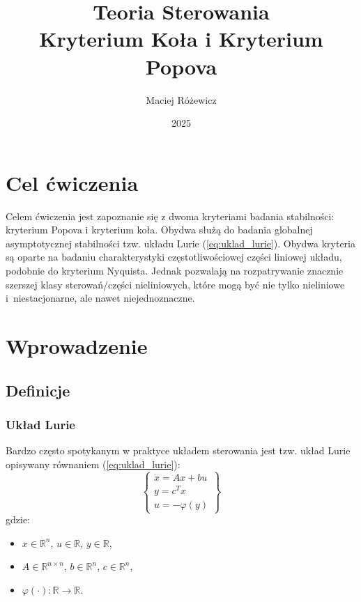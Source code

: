 \documentclass{article}
\title{
    Teoria Sterowania\\
    \Large Kryterium Koła i Kryterium Popova
}
\author{Maciej Różewicz}
\date{2025}
\begin{document}
\maketitle
\newpage

\section{Cel ćwiczenia}
Celem ćwiczenia jest zapoznanie się z dwoma kryteriami badania stabilności: kryterium Popova i kryterium koła.
Obydwa służą do badania globalnej asymptotycznej stabilności tzw. układu Lurie (\ref{eq:uklad_lurie}).
Obydwa kryteria są oparte na badaniu charakterystyki częstotliwościowej części liniowej układu, podobnie do kryterium Nyquista.
Jednak pozwalają na rozpatrywanie znacznie szerszej klasy sterowań/części nieliniowych, które mogą być nie tylko nieliniowe i~niestacjonarne, ale nawet niejednoznaczne.

\section{Wprowadzenie}
    \subsection{Definicje}
        \subsubsection{Układ Lurie}
        Bardzo często spotykanym w praktyce układem sterowania jest tzw. układ Lurie opisywany równaniem (\ref{eq:uklad_lurie}):
        \begin{equation}
            \label{eq:uklad_lurie}
            \left\{
            \begin{array}{l}
                \dot{x} = Ax + bu\\
                y = c^{T}x\\
                u = -\varphi(y)
            \end{array}
            \right\}
        \end{equation}
        gdzie:
        \begin{itemize}
            \item $x \in \mathbb{R}^{n}$, $u \in \mathbb{R}$, $y \in \mathbb{R}$,
            \item $A \in \mathbb{R}^{n \times n}$, $b \in \mathbb{R}^{n}$, $c \in \mathbb{R}^{n}$,
            \item $\varphi(\cdot): \mathbb{R} \rightarrow \mathbb{R}$.
        \end{itemize}
    
\end{document}
